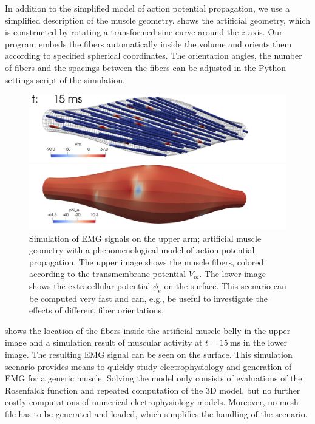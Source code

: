 In addition to the simplified model of action potential propagation, we use a simplified description of the muscle geometry.  shows the artificial geometry, which is constructed by rotating a transformed sine curve around the $z$ axis. 
Our program embeds the fibers automatically inside the volume and orients them according to specified spherical coordinates. The orientation angles, the number of fibers and the spacings between the fibers can be adjusted in the Python settings script of the simulation.

\begin{figure}
  \centering%
  \includegraphics[width=\textwidth]{images/results/application/custom_geometry.png}%
  \caption{Simulation of EMG signals on the upper arm; artificial muscle geometry with a phenomenological model of action potential propagation. The upper image shows the muscle fibers, colored according to the transmembrane potential $V_m$. The lower image shows the extracellular potential $\phi_e$ on the surface.
  This scenario can be computed very fast and can, e.g., be useful to investigate the effects of different fiber orientations.}%
  \label{fig:custom_geometry}%
\end{figure}

 shows the location of the fibers inside the artificial muscle belly in the upper image and a simulation result of muscular activity  at $t=\SI{15}{\ms}$ in the lower image. The resulting EMG signal can be seen on the surface.
This simulation scenario provides means to quickly study electrophysiology and generation of EMG for a generic muscle. Solving the model only consists of evaluations of the Rosenfalck function and repeated computation of the 3D model, but no further costly computations of numerical electrophysiology models. Moreover, no mesh file has to be generated and loaded, which simplifies the handling of the scenario.

